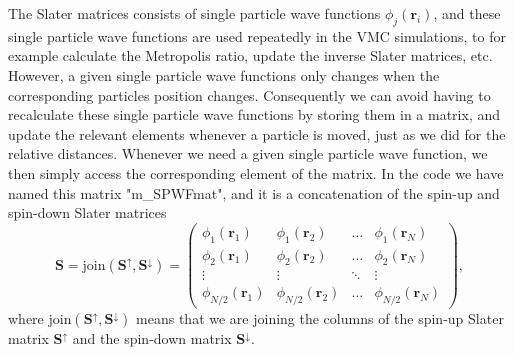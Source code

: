 \documentclass[../main.tex]{subfiles}
\begin{document}
The Slater matrices consists of single particle wave functions $\phi_j(\mathbf{r}_i)$, and these single particle wave functions are used repeatedly in the VMC simulations, to for example calculate  the Metropolis ratio, update the inverse Slater matrices, etc. However, a given single particle wave functions only changes when the corresponding particles position changes. Consequently we can avoid having to recalculate these single particle wave functions by storing them in a matrix, and update the relevant elements whenever a particle is moved, just as we did for the relative distances. Whenever we need a given single particle wave function, we then simply access the corresponding element of the matrix. In the code we have named this matrix "m\_SPWFmat", and it is a concatenation of the spin-up and spin-down Slater matrices
\begin{equation}
    \mathbf{S} = \textrm{join}(\mathbf{S}^\uparrow, \mathbf{S}^\downarrow) =
    \left( \begin{array}{cccc} \phi_1(\mathbf{r}_1) & \phi_1(\mathbf{r}_2) & \dots & \phi_1(\mathbf{r}_N)\\
                                \phi_2(\mathbf{r}_1) & \phi_2(\mathbf{r}_2) & \dots & \phi_2(\mathbf{r}_N)\\
                                \vdots & \vdots & \ddots & \vdots\\
                                \phi_{N/2}(\mathbf{r}_1) & \phi_{N/2}(\mathbf{r}_2) & \dots & \phi_{N/2}(\mathbf{r}_N)

             \end{array} \right),
\end{equation}
where $\textrm{join}(\mathbf{S}^\uparrow, \mathbf{S}^\downarrow)$ means that we are joining the columns of the spin-up Slater matrix $\mathbf{S}^\uparrow$ and the spin-down matrix $\mathbf{S}^\downarrow$.
\end{document}
